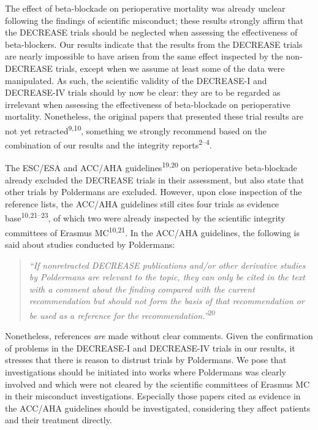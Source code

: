 \documentclass[]{article}
\begin{document}
The effect of beta-blockade on perioperative mortality was already
unclear following the findings of scientific misconduct; these results
strongly affirm that the DECREASE trials should be neglected when
assessing the effectiveness of beta-blockers. Our results indicate that
the results from the DECREASE trials are nearly impossible to have
arisen from the same effect inspected by the non-DECREASE trials, except
when we assume at least some of the data were manipulated. As such, the
scientific validity of the DECREASE-I and DECREASE-IV trials should by
now be clear: they are to be regarded as irrelevant when assessing the
effectiveness of beta-blockade on perioperative mortality. Nonetheless,
the original papers that presented these trial results are not yet
retracted\textsuperscript{9,10}, something we strongly recommend based
on the combination of our results and the integrity
reports\textsuperscript{2--4}.

The ESC/ESA and ACC/AHA guidelines\textsuperscript{19,20} on
perioperative beta-blockade already excluded the DECREASE trials in
their assessment, but also state that other trials by Poldermans are
excluded. However, upon close inspection of the reference lists, the
ACC/AHA guidelines still cites four trials as evidence
base\textsuperscript{10,21--23}, of which two were already inspected by
the scientific integrity committees of Erasmus
MC\textsuperscript{10,21}. In the ACC/AHA guidelines, the following is
said about studies conducted by Poldermans:

\begin{quote}
\emph{``If nonretracted DECREASE publications and/or other derivative
studies by Poldermans are relevant to the topic, they can only be cited
in the text with a comment about the finding compared with the current
recommendation but should not form the basis of that recommendation or
be used as a reference for the recommendation.''}\textsuperscript{20}
\end{quote}

Nonetheless, references \emph{are} made without clear comments. Given
the confirmation of problems in the DECREASE-I and DECREASE-IV trials in
our results, it stresses that there is reason to distrust trials by
Poldermans. We pose that investigations should be initiated into works
where Poldermans was clearly involved and which were not cleared by the
scientific committees of Erasmus MC in their misconduct investigations.
Especially those papers cited as evidence in the ACC/AHA guidelines
should be investigated, considering they affect patients and their
treatment directly.
\end{document}
